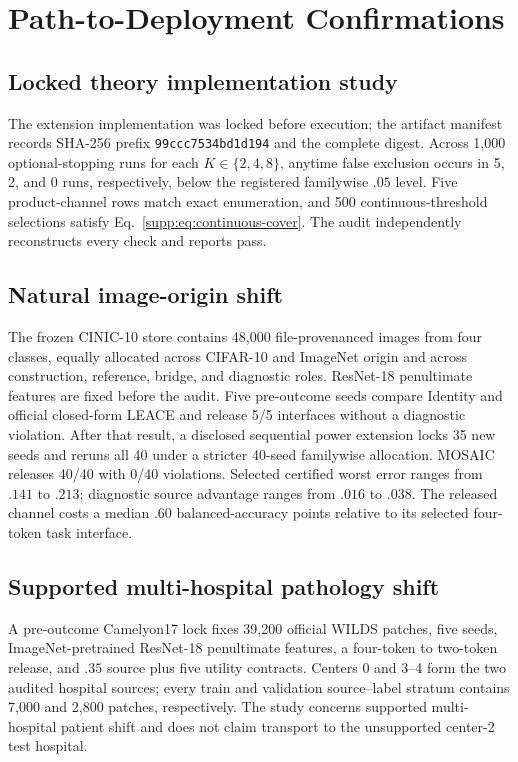 \section{Path-to-Deployment Confirmations}

\subsection{Locked theory implementation study}

The extension implementation was locked before execution; the artifact
manifest records SHA-256 prefix \texttt{99ccc7534bd1d194} and the complete
digest.
Across 1,000 optional-stopping runs for each $K\in\{2,4,8\}$, anytime false
exclusion occurs in 5, 2, and 0 runs, respectively, below the registered
familywise $.05$ level. Five product-channel rows match exact enumeration, and
500 continuous-threshold selections satisfy Eq.~\eqref{supp:eq:continuous-cover}.
The audit independently reconstructs every check and reports pass.

\subsection{Natural image-origin shift}

The frozen CINIC-10 store contains 48,000 file-provenanced images from four
classes, equally allocated across CIFAR-10 and ImageNet origin and across
construction, reference, bridge, and diagnostic roles. ResNet-18 penultimate
features are fixed before the audit. Five pre-outcome seeds compare Identity
and official closed-form LEACE and release 5/5 interfaces without a diagnostic
violation. After that result, a disclosed sequential power extension locks 35
new seeds and reruns all 40 under a stricter 40-seed familywise allocation.
MOSAIC releases 40/40 with 0/40 violations. Selected certified worst error
ranges from $.141$ to $.213$; diagnostic source advantage ranges from $.016$
to $.038$. The released channel costs a median $.60$ balanced-accuracy points
relative to its selected four-token task interface.

\subsection{Supported multi-hospital pathology shift}

A pre-outcome Camelyon17 lock fixes 39,200 official WILDS patches, five seeds,
ImageNet-pretrained ResNet-18 penultimate features, a four-token to two-token
release, and $.35$ source plus five utility contracts. Centers 0 and 3--4 form
the two audited hospital sources; every train and validation source--label
stratum contains 7,000 and 2,800 patches, respectively. The study concerns
supported multi-hospital patient shift and does not claim transport to the
unsupported center-2 test hospital.

